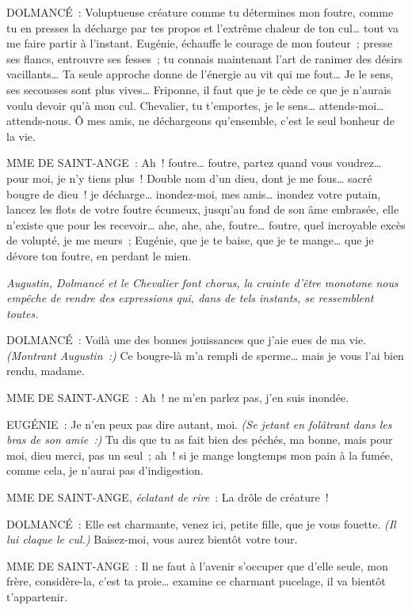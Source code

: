 \documentclass[french,twoside]{book} %
\begin{document}
DOLMANCÉ : Voluptueuse créature comme tu détermines mon foutre, comme tu en presses la décharge par tes propos et l’extrême chaleur de ton cul… tout va me faire partir à l’instant. Eugénie, échauffe le courage de mon fouteur ; presse ses flancs, entrouvre ses fesses ; tu connais maintenant l’art de ranimer des désirs vacillants… Ta seule approche donne de l’énergie au vit qui me fout… Je le sens, ses secousses sont plus vives… Friponne, il faut que je te cède ce que je n’aurais voulu devoir qu’à mon cul. Chevalier, tu t’emportes, je le sens… attends-moi… attends-nous. Ô mes amis, ne déchargeons qu’ensemble, c’est le seul bonheur de la vie.\par
MME DE SAINT-ANGE : Ah ! foutre… foutre, partez quand vous voudrez… pour moi, je n’y tiens plus ! Double nom d’un dieu, dont je me fous… sacré bougre de dieu ! je décharge… inondez-moi, mes amis… inondez votre putain, lancez les flots de votre foutre écumeux, jusqu’au fond de son âme embrasée, elle n’existe que pour les recevoir… ahe, ahe, ahe, foutre… foutre, quel incroyable excès de volupté, je me meurs ; Eugénie, que je te baise, que je te mange… que je dévore ton foutre, en perdant le mien.\par
{\itshape Augustin, Dolmancé et le Chevalier font chorus, la crainte d’être monotone nous empêche de rendre des expressions qui, dans de tels instants, se ressemblent toutes.}\par
DOLMANCÉ : Voilà une des bonnes jouissances que j’aie eues de ma vie. {\itshape (Montrant Augustin :)} Ce bougre-là m’a rempli de sperme… mais je vous l’ai bien rendu, madame.\par
MME DE SAINT-ANGE : Ah ! ne m’en parlez pas, j’en suis inondée.\par
EUGÉNIE : Je n’en peux pas dire autant, moi. {\itshape (Se jetant en folâtrant dans les bras de son amie :)} Tu dis que tu as fait bien des péchés, ma bonne, mais pour moi, dieu merci, pas un seul ; ah ! si je mange longtemps mon pain à la fumée, comme cela, je n’aurai pas d’indigestion.\par
MME DE SAINT-ANGE, {\itshape éclatant de rire} : La drôle de créature !\par
DOLMANCÉ : Elle est charmante, venez ici, petite fille, que je vous fouette. {\itshape (Il lui claque le cul.)} Baisez-moi, vous aurez bientôt votre tour.\par
MME DE SAINT-ANGE : Il ne faut à l’avenir s’occuper que d’elle seule, mon frère, considère-la, c’est ta proie… examine ce charmant pucelage, il va bientôt t’appartenir.\par
\end{document}
